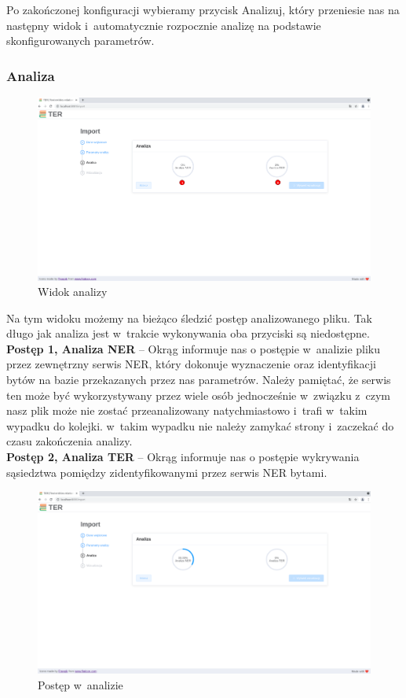 \documentclass[12pt, a4paper]{article}
\begin{document}
Po zakończonej konfiguracji wybieramy przycisk Analizuj, który przeniesie nas na następny widok i~automatycznie rozpocznie analizę na podstawie skonfigurowanych parametrów.


\subsubsection{Analiza}

\begin{figure}[H]
  \centering
  \includegraphics[width=\linewidth]{images/analiza.png}
  \caption{Widok analizy}
\end{figure}

Na tym widoku możemy na bieżąco śledzić postęp analizowanego pliku. Tak długo jak analiza jest w~trakcie wykonywania oba przyciski są niedostępne.\\

\noindent\textbf{Postęp 1, Analiza NER} -- Okrąg informuje nas o postępie w~analizie pliku przez zewnętrzny serwis NER, który dokonuje wyznaczenie oraz identyfikacji bytów na bazie przekazanych przez nas parametrów. Należy pamiętać, że serwis ten może być wykorzystywany przez wiele osób jednocześnie w~związku z~czym nasz plik może nie zostać przeanalizowany natychmiastowo i~trafi w~takim wypadku do kolejki. w~takim wypadku nie należy zamykać strony i~zaczekać do czasu zakończenia analizy.\\

\noindent\textbf{Postęp 2, Analiza TER} -- Okrąg informuje nas o postępie wykrywania sąsiedztwa pomiędzy zidentyfikowanymi przez serwis NER bytami.

\begin{figure}[H]
  \centering
  \includegraphics[width=\linewidth]{images/analiza-w-trakcie.png}
  \caption{Postęp w~analizie}
\end{figure}
\end{document}
